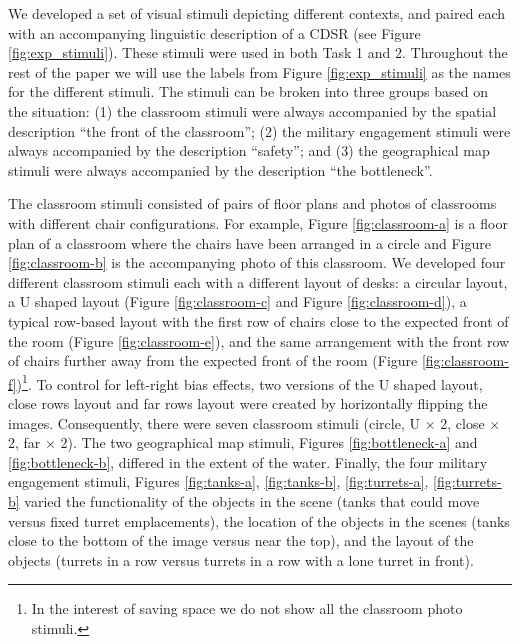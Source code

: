 \documentclass[11pt,letterpaper]{article}
\begin{document}
We developed a set of visual stimuli depicting different contexts, and paired each with an accompanying linguistic description of a CDSR (see Figure \ref{fig:exp_stimuli}). These stimuli were used in both Task 1 and 2. Throughout the rest of the paper we will use the labels from Figure \ref{fig:exp_stimuli} as the names for the different stimuli. The stimuli can be broken into three groups based on the situation: (1) the classroom stimuli were always accompanied by the spatial description ``the front of the classroom''; (2) the military engagement stimuli were always accompanied by the description ``safety''; and (3) the geographical map stimuli were always accompanied by the description ``the bottleneck''.

The classroom stimuli consisted of pairs of floor plans and photos of classrooms with different chair configurations. For example, Figure \ref{fig:classroom-a} is a floor plan of a classroom where the chairs have been arranged in a circle and Figure \ref{fig:classroom-b} is the accompanying photo of this classroom. We developed four different classroom stimuli each with a different layout of desks: a circular layout, a U shaped layout (Figure \ref{fig:classroom-c} and Figure \ref{fig:classroom-d}), a typical row-based layout with the first row of chairs close to the expected front of the room (Figure \ref{fig:classroom-e}), and the same arrangement with the front row of chairs further away from the expected front of the room (Figure \ref{fig:classroom-f})\footnote{In the interest of saving space we do not show all the classroom photo stimuli.}. To control for left-right bias effects, two versions of the U shaped layout, close rows layout and far rows layout were created by horizontally flipping the images. Consequently, there were seven classroom stimuli (circle, U $\times$ 2, close $\times$ 2, far $\times$ 2).  The two geographical map stimuli, Figures \ref{fig:bottleneck-a} and \ref{fig:bottleneck-b}, differed in the extent of the water.  Finally, the four military engagement stimuli, Figures \ref{fig:tanks-a}, \ref{fig:tanks-b}, \ref{fig:turrets-a}, \ref{fig:turrets-b} varied the functionality of the objects in the scene (tanks that could move versus fixed turret emplacements), the location of the objects in the scenes (tanks close to the bottom of the image versus near the top), and the layout of the objects (turrets in a row versus turrets in a row with a lone turret in front). 
\end{document}
